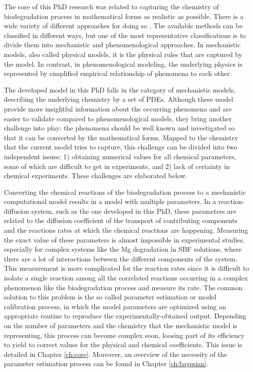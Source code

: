 
The core of this PhD research was related to capturing the chemistry of biodegradation process in mathematical forms as realistic as possible. There is a wide variety of different approaches for doing so \cite{Abdalla2020}. The available methods can be classified in different ways, but one of the most representative classifications is to divide them into mechanistic and phenomenological approaches. In mechanistic models, also called physical models, it is the physical rules that are captured by the model. In contrast, in phenomenological modeling, the underlying physics is represented by simplified empirical relationship of phenomena to each other. 

The developed model in this PhD falls in the category of mechanistic models, describing the underlying chemistry by a set of PDEs. Although these model provide more insightful information about the occurring phenomena and are easier to validate compared to phenomenological models, they bring another challenge into play: the phenomena should be well known and investigated so that it can be converted by the mathematical forms. Mapped to the chemistry that the current model tries to capture, this challenge can be divided into two independent issues: 1) obtaining numerical values for all chemical parameters, some of which are difficult to get in experiments, and 2) lack of certainty in chemical experiments. These challenges are elaborated below.

Converting the chemical reactions of the biodegradation process to a mechanistic computational model results in a model with multiple parameters. In a reaction-diffusion system, such as the one developed in this PhD, these parameters are related to the diffusion coefficient of the transport of contributing components and the reactions rates at which the chemical reactions are happening. Measuring the exact value of these parameters is almost impossible in experimental studies, especially for complex systems like the Mg degradation in SBF solutions, where there are a lot of interactions between the different components of the system. This measurement is more complicated for the reaction rates since it is difficult to isolate a single reaction among all the correlated reactions occurring in a complex phenomenon like the biodegradation process and measure its rate. The common solution to this problem is the so called parameter estimation or model calibration process, in which the model parameters are optimized using an appropriate routine to reproduce the experimentally-obtained output. Depending on the number of parameters and the chemistry that the mechanistic model is representing, this process can become complex soon, loosing part of its efficiency to yield to correct values for the physical and chemical coefficients. This issue is detailed in Chapter \ref{ch:core}. Moreover, an overview of the necessity of the parameter estimation process can be found in Chapter \ref{ch:bayesian}.

